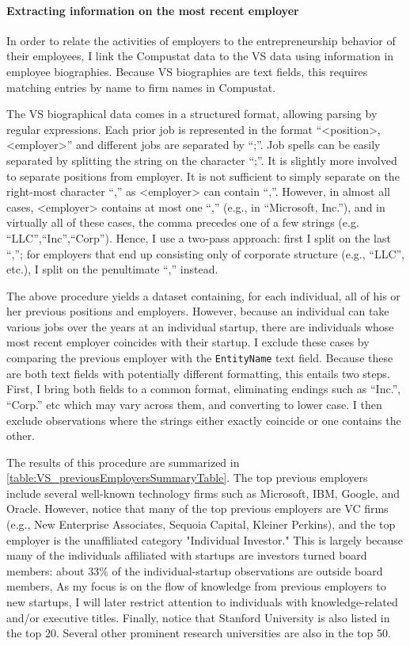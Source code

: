 \documentclass[11pt,english]{article}
\theoremstyle{remark}
\begin{document}


\paragraph{Extracting information on the most recent employer}

In order to relate the activities of employers to the entrepreneurship behavior of their employees, I link the Compustat data to the VS data using information in employee biographies. Because VS biographies are text fields, this requires matching entries by name to firm names in Compustat.  

The VS biographical data comes in a structured format, allowing parsing by regular expressions. Each prior job is represented in the format ``<position>, <employer>'' and different jobs are separated by ``;''. Job spells can be easily separated by splitting the string on the character ``;''. It is slightly more involved to separate positions from employer. It is not sufficient to simply separate on the right-most character ``,'' as <employer> can contain ``,''. However, in almost all cases, <employer> contains at most one ``,'' (e.g., in ``Microsoft, Inc.''), and in virtually all of these cases, the comma precedes one of a few strings (e.g. ``LLC'',``Inc'',``Corp''). Hence, I use a two-pass approach: first I split on the last ``,''; for employers that end up consisting only of corporate structure (e.g., ``LLC'', etc.), I split on the penultimate ``,'' instead. 

The above procedure yields a dataset containing, for each individual, all of his or her previous positions and employers. However, because an individual can take various jobs over the years at an individual startup, there are individuals whose most recent employer coincides with their startup. I exclude these cases by comparing the previous employer with the \texttt{EntityName} text field. Because these are both text fields with potentially different formatting, this entails two steps. First, I bring both fields to a common format, eliminating endings such as ``Inc.'', ``Corp.'' etc which may vary across them, and converting to lower case. I then exclude observations where the strings either exactly coincide or one contains the other. 

The results of this procedure are summarized in \autoref{table:VS_previousEmployersSummaryTable}. The top previous employers include several well-known technology firms such as Microsoft, IBM, Google, and Oracle. However, notice that many of the top previous employers are VC firms (e.g., New Enterprise Associates, Sequoia Capital, Kleiner Perkins), and the top employer is the unaffiliated category "Individual Investor." This is largely because many of the individuals affiliated with startups are investors turned board members: about 33\% of the individual-startup observations are outside board members, As my focus is on the flow of knowledge from previous employers to new startups, I will later restrict attention to individuals with knowledge-related and/or executive titles. Finally, notice that Stanford University is also listed in the top 20. Several other prominent research universities are also in the top 50. 
\end{document}
